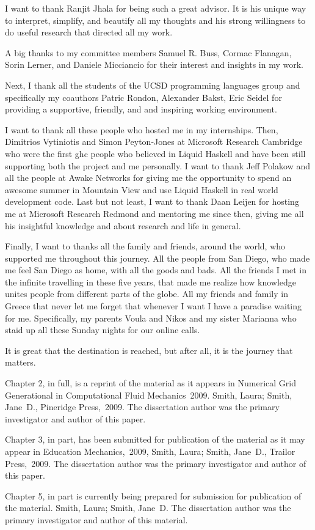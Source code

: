 I want to thank Ranjit Jhala for being such a great advisor. 
%
It is his unique way to interpret, simplify, and beautify all my 
thoughts
and his strong willingness to do useful research 
that directed all my work. 

A big thanks to my committee members 
Samuel R. Buss, 
Cormac Flanagan,
Sorin Lerner, 
and Daniele Micciancio for their interest and insights in my work. 

Next, I thank all the students of the UCSD programming languages group and specifically my coauthors
Patric Rondon,
Alexander Bakst, 
Eric Seidel 
for providing a supportive, friendly, and and inspiring working environment.

I want to thank all these people who hosted me in my internships. 
%
%
Then, Dimitrios Vytiniotis and Simon Peyton-Jones
at Microsoft Research Cambridge
who were the first ghc people who believed in Liquid Haskell
and have been still supporting both the project and me personally.
%
I want to thank Jeff Polakow and all the people at Awake Networks 
for giving me the opportunity to spend an awesome summer in Mountain View 
and use Liquid Haskell in real world development code. 
%
Last but not least, 
I want to thank Daan Leijen 
for hosting me at Microsoft Research Redmond 
and mentoring me since then, giving me all his insightful
knowledge and  about research and life in general.

Finally, I want to thanks all the family and friends, around the world,
who supported me throughout this journey.
%
All the people from San Diego, 
who made me feel San Diego as home, with all the goods and bads. 
%
All the friends I met in the infinite travelling in these five years, 
that made me realize how knowledge unites people from different parts of the globe.
%
All my friends and family in Greece that never let me forget that
whenever I want I have a paradise waiting for me.  
%
Specifically, my parents Voula and Nikos and my sister Marianna
who staid up all these Sunday nights for our online calls. 

It is great that the destination is reached, 
but after all, it is the journey that matters. 




Chapter 2, in full, is a reprint of the material as it appears in
Numerical Grid Generational in Computational Fluid Mechanics~2009.
Smith, Laura; Smith, Jane~D., Pineridge Press,~2009. The dissertation
author was the primary investigator and author of this paper.

Chapter 3, in part, has been submitted for publication of the material
as it may appear in Education Mechanics,~2009, Smith, Laura; Smith,
Jane~D., Trailor Press,~2009. The dissertation author was the primary
investigator and author of this paper.

Chapter 5, in part is currently being prepared for submission for
publication of the material. Smith, Laura; Smith, Jane~D\@. The
dissertation author was the primary investigator and author of this
material.
